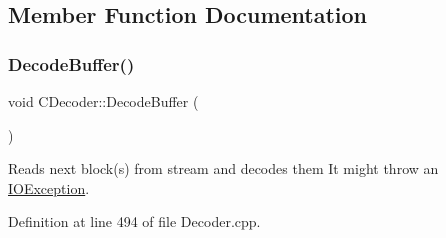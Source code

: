 \subsection{Member Function Documentation}
\mbox{\label{classCDecoder_a78b5590168027919fcdba0ee9cbe2610}} 
\subsubsection{\texorpdfstring{DecodeBuffer()}{DecodeBuffer()}}
{\footnotesize\ttfamily void C\+Decoder\+::\+Decode\+Buffer (\begin{DoxyParamCaption}{ }\end{DoxyParamCaption})}

Reads next block(s) from stream and decodes them It might throw an \mbox{\hyperlink{structIOException}{I\+O\+Exception}}. 

Definition at line 494 of file Decoder.\+cpp.


